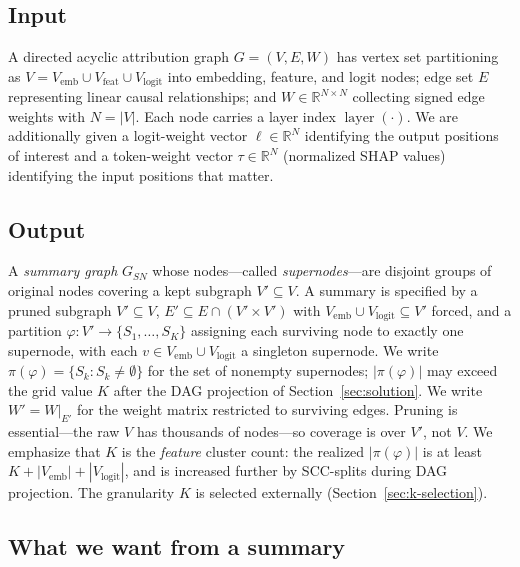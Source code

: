 \documentclass[table, 11pt]{article}
\DeclareMathOperator{\layer}{layer}
\begin{document}
\subsection{Input}\label{sec:input}

A directed acyclic attribution graph $G = (V, E, W)$ has vertex set
partitioning as $V = V_{\text{emb}} \cup V_{\text{feat}} \cup
V_{\text{logit}}$ into embedding, feature, and logit nodes; edge set
$E$ representing linear causal relationships; and $W \in
\mathbb{R}^{N \times N}$ collecting signed edge weights with $N =
|V|$. Each node carries a layer index $\layer(\cdot)$. We are
additionally given a logit-weight vector $\ell \in \mathbb{R}^N$
identifying the output positions of interest and a token-weight
vector $\tau \in \mathbb{R}^N$ (normalized SHAP values) identifying
the input positions that matter.

\subsection{Output}\label{sec:output}

A \emph{summary graph} $G_{SN}$ whose nodes---called
\emph{supernodes}---are disjoint groups of original nodes covering a
kept subgraph $V' \subseteq V$. A summary is specified by a pruned
subgraph $V' \subseteq V$, $E' \subseteq E \cap (V' \times V')$ with
$V_{\text{emb}} \cup V_{\text{logit}} \subseteq V'$ forced, and a
partition $\varphi : V' \to \{S_1, \ldots, S_K\}$ assigning each
surviving node to exactly one supernode, with each $v \in
V_{\text{emb}} \cup V_{\text{logit}}$ a singleton supernode. We write
$\pi(\varphi) = \{S_k : S_k \ne \emptyset\}$ for the set of nonempty
supernodes; $|\pi(\varphi)|$ may exceed the grid value $K$ after the
DAG projection of Section~\ref{sec:solution}. We write $W' = W|_{E'}$
for the weight matrix restricted to surviving edges. Pruning is
essential---the raw $V$ has thousands of nodes---so coverage is over
$V'$, not $V$. We emphasize that $K$ is the \emph{feature} cluster
count: the realized $|\pi(\varphi)|$ is at least $K +
|V_{\text{emb}}| + |V_{\text{logit}}|$, and is increased further by
SCC-splits during DAG projection. The granularity $K$ is selected
externally (Section~\ref{sec:k-selection}).

\subsection{What we want from a summary}\label{sec:desiderata}
\end{document}
